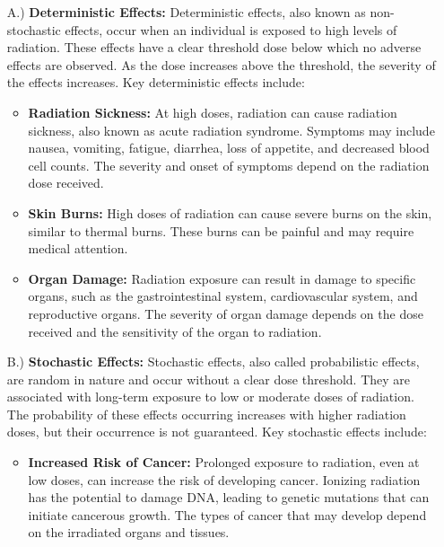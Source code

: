 \documentclass[../introduction.tex]{subfiles}
\begin{document}
        \begin{enumerate}
            \item[A.)] \textbf{Deterministic Effects:} Deterministic effects, also known as non-stochastic effects, occur when an 
            individual is exposed to high levels of radiation. These effects have a clear threshold dose below which no adverse effects are observed. 
            As the dose increases above the threshold, the severity of the effects increases. Key deterministic effects include:

            \begin{itemize}
                \item \textbf{Radiation Sickness:} At high doses, radiation can cause radiation sickness, also known as acute radiation syndrome. 
                Symptoms may include nausea, vomiting, fatigue, diarrhea, loss of appetite, and decreased blood cell counts. 
                The severity and onset of symptoms depend on the radiation dose received.

                \item \textbf{Skin Burns:} High doses of radiation can cause severe burns on the skin, similar to thermal burns. 
                These burns can be painful and may require medical attention.

                \item \textbf{Organ Damage:} Radiation exposure can result in damage to specific organs, such as the gastrointestinal system, 
                cardiovascular system, and reproductive organs. The severity of organ damage depends on the dose received and the sensitivity of 
                the organ to radiation.

            \end{itemize} 

            \item[B.)] \textbf{Stochastic Effects:}
            Stochastic effects, also called probabilistic effects, are random in nature and occur without a clear dose threshold. 
            They are associated with long-term exposure to low or moderate doses of radiation. The probability of these effects occurring 
            increases with higher radiation doses, but their occurrence is not guaranteed. Key stochastic effects include:

            \begin{itemize}
                \item \textbf{Increased Risk of Cancer:} Prolonged exposure to radiation, even at low doses, can increase the risk of 
                developing cancer. Ionizing radiation has the potential to damage DNA, leading to genetic mutations that can 
                initiate cancerous growth. The types of cancer that may develop depend on the irradiated organs and tissues.


\end{itemize}
\end{enumerate}
\end{document}
